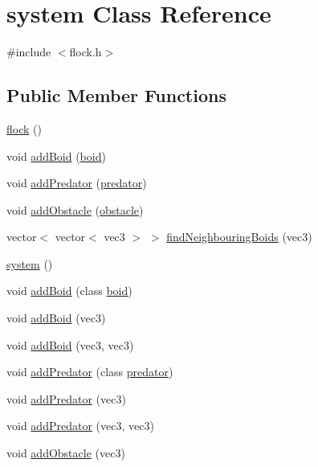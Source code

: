 \hypertarget{classsystem}{}\section{system Class Reference}
\label{classsystem}


{\ttfamily \#include $<$flock.\+h$>$}

\subsection*{Public Member Functions}
\begin{DoxyCompactItemize}
\item 
\mbox{\hyperlink{classsystem_a6111884d57e02489e3d2384a082d3965}{flock}} ()
\item 
void \mbox{\hyperlink{classsystem_af7af840379b2e3471ef14412593780b8}{add\+Boid}} (\mbox{\hyperlink{classboid}{boid}})
\item 
void \mbox{\hyperlink{classsystem_ae71d054521e65e5a3ef29939b3a9bf96}{add\+Predator}} (\mbox{\hyperlink{classpredator}{predator}})
\item 
void \mbox{\hyperlink{classsystem_ae833bb87bebc9314c67420967ceaba49}{add\+Obstacle}} (\mbox{\hyperlink{classobstacle}{obstacle}})
\item 
vector$<$ vector$<$ vec3 $>$ $>$ \mbox{\hyperlink{classsystem_abbaeb1ad1271eb4dccb006f3a33bdc0b}{find\+Neighbouring\+Boids}} (vec3)
\item 
\mbox{\hyperlink{classsystem_a1f1b25f81874eb56b3aeff1c8677b163}{system}} ()
\item 
void \mbox{\hyperlink{classsystem_a5b11d24096427c34764961379e136692}{add\+Boid}} (class \mbox{\hyperlink{classboid}{boid}})
\item 
void \mbox{\hyperlink{classsystem_a91898e2f06638b8f931bb6fa58bc2f4d}{add\+Boid}} (vec3)
\item 
void \mbox{\hyperlink{classsystem_ab5f711df3bc87e15ca1b9f25bf2fbf44}{add\+Boid}} (vec3, vec3)
\item 
void \mbox{\hyperlink{classsystem_abb9eebd8bd6056a1dd2870314910ee7b}{add\+Predator}} (class \mbox{\hyperlink{classpredator}{predator}})
\item 
void \mbox{\hyperlink{classsystem_a67e7e860c9d735a214ad1fe849453beb}{add\+Predator}} (vec3)
\item 
void \mbox{\hyperlink{classsystem_a5392d2e5ff4b8ea1f34da8576a726ff8}{add\+Predator}} (vec3, vec3)
\item 
void \mbox{\hyperlink{classsystem_af4b8bef2015e79f8b1a49f0ffd4b408c}{add\+Obstacle}} (vec3)

\end{DoxyCompactItemize}
